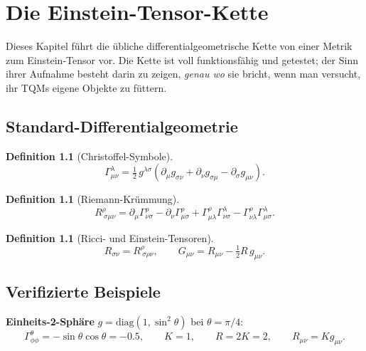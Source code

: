 \documentclass[10pt,twoside,openany]{book}
\newtheorem{definition}[theorem]{Definition}
\begin{document}
\chapter{Die Einstein-Tensor-Kette}
\label{ch:einstein-tensor}

Dieses Kapitel führt die übliche differentialgeometrische Kette von einer Metrik zum
Einstein-Tensor vor. Die Kette ist voll funktionsfähig und getestet; der Sinn ihrer
Aufnahme besteht darin zu zeigen, \emph{genau wo} sie bricht, wenn man versucht, ihr TQMs
eigene Objekte zu füttern.

\section{Standard-Differentialgeometrie}

\begin{definition}[Christoffel-Symbole]
\begin{equation}
\Gamma^\lambda_{\mu\nu} = \tfrac12\, g^{\lambda\sigma}
\left( \partial_\mu g_{\sigma\nu} + \partial_\nu g_{\sigma\mu} - \partial_\sigma g_{\mu\nu} \right).
\end{equation}
\end{definition}

\begin{definition}[Riemann-Krümmung]
\begin{equation}
R^\rho_{\ \sigma\mu\nu} = \partial_\mu \Gamma^\rho_{\nu\sigma}
- \partial_\nu \Gamma^\rho_{\mu\sigma}
+ \Gamma^\rho_{\mu\lambda}\Gamma^\lambda_{\nu\sigma}
- \Gamma^\rho_{\nu\lambda}\Gamma^\lambda_{\mu\sigma}.
\end{equation}
\end{definition}

\begin{definition}[Ricci- und Einstein-Tensoren]
\begin{equation}
R_{\sigma\nu} = R^\rho_{\ \sigma\rho\nu}, \qquad
G_{\mu\nu} = R_{\mu\nu} - \tfrac12 R\, g_{\mu\nu}.
\end{equation}
\end{definition}

\section{Verifizierte Beispiele}

\textbf{Einheits-2-Sphäre} $g=\mathrm{diag}(1,\sin^2\theta)$ bei $\theta=\pi/4$:
\begin{equation}
\Gamma^\theta_{\phi\phi} = -\sin\theta\cos\theta = -0.5,
\qquad K = 1, \qquad R = 2K = 2, \qquad R_{\mu\nu}=K g_{\mu\nu}.
\end{equation}
\end{document}
